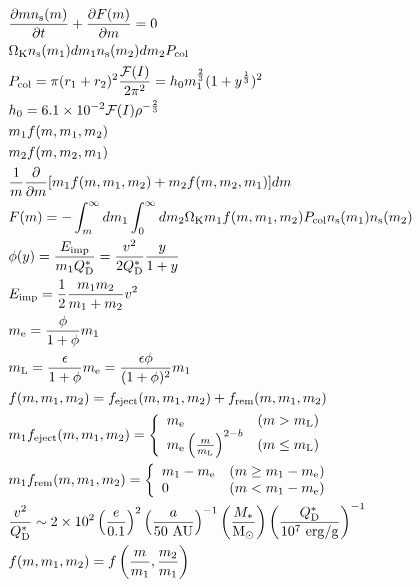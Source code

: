\documentclass[11pt,a4paper,oneside,onecolumn]{jreport}
\begin{document}
\begin{align}
 &\frac{\partial m n_{\rm s}(m)}{\partial t} + \frac{\partial F(m)}{\partial m} = 0\\
 &\Omega_{\rm K} n_{\rm s} (m_1) d m_1 n_{\rm s} (m_2) d m_2 P_{\rm col}\\
 &P_{\rm col} = \pi (r_1 + r_2)^2 \frac{{\cal F} (I)}{2 \pi^2} = h_0 m_1^{\frac{2}{3}} (1 + y^{\frac{1}{3}})^2\\
 &h_0 = 6.1 \times 10^{-2} {\cal F} (I) \rho ^{- \frac{2}{3}}\\
 &m_1 f (m, m_1, m_2)\\
 &m_2 f (m, m_2, m_1)\\
 &\frac{1}{m} \frac{\partial}{\partial m} [m_1 f (m, m_1, m_2) + m_2 f (m, m_2, m_1)] dm\\
 &F (m) = - \int_m^{\infty} d m_1 \int_0^{\infty} d m_2 \Omega_{\rm K} m_1 f(m, m_1, m_2) P_{\rm col} n_{\rm s} (m_1) n_{\rm s} (m_2)\\
 &\phi (y) = \frac{E_{\rm imp}}{m_1 Q_{\rm D}^{\ast}} = \frac{v^2}{2 Q_{\rm D}^{\ast}} \frac{y}{1 + y}\\
 &E_{\rm imp} = \frac{1}{2} \frac{m_1 m_2}{m_1 + m_2} v^2\\
 &m_{\rm e} = \frac{\phi}{1 + \phi} m_1\\
 &m_{\rm L} = \frac{\epsilon}{1 + \phi} m_{\rm e} = \frac{\epsilon \phi}{(1 + \phi)^2} m_1\\
 &f (m, m_1, m_2) = f_{\rm eject} (m, m_1, m_2) + f_{\rm rem} (m, m_1, m_2)\\
 &m_1 f_{\rm eject} (m, m_1, m_2) = \left\{
 \begin{array}{ll}
  m_{\rm e} & (m>m_{\rm L})\\
  m_{\rm e} \left( \frac{m}{m_{\rm L}} \right)^{2-b} & (m \leq m_{\rm L})\\
 \end{array}
 \right.\\
 &m_1 f_{\rm rem} (m, m_1, m_2) = \left\{
 \begin{array}{ll}
  m_1 - m_{\rm e} & (m \geq m_1 - m_{\rm e})\\
  0 & (m < m_1 - m_{\rm e})\\
 \end{array}
 \right.\\
 &\frac{v^2}{Q_{\rm D}^{\ast}} \sim 2 \times 10^2 \left( \frac{e}{0.1} \right)^2 \left( \frac{a}{50\ {\rm AU}} \right)^{-1} \left( \frac{M_{\ast}}{{\rm M_{\odot}}} \right) \left( \frac{Q_{\rm D}^{\ast}}{10^7\ {\rm erg/g}} \right)^{-1}\\
 &f (m, m_1, m_2) = f \left( \frac{m}{m_1}, \frac{m_2}{m_1} \right)
\end{align}
 
\end{document}

